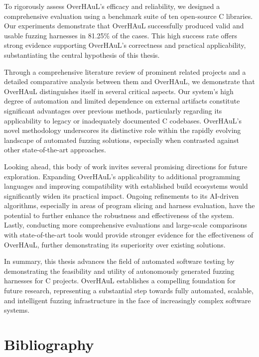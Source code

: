 \documentclass[
  a4paper,
]{scrreprt}
\theoremstyle{definition}
\theoremstyle{remark}
\begin{document}
To rigorously assess OverHAuL's efficacy and reliability, we designed a
comprehensive evaluation using a benchmark suite of ten open-source C
libraries. Our experiments demonstrate that OverHAuL successfully
produced valid and usable fuzzing harnesses in 81.25\% of the cases.
This high success rate offers strong evidence supporting OverHAuL's
correctness and practical applicability, substantiating the central
hypothesis of this thesis.

Through a comprehensive literature review of prominent related projects
and a detailed comparative analysis between them and OverHAuL, we
demonstrate that OverHAuL distinguishes itself in several critical
aspects. Our system's high degree of automation and limited dependence
on external artifacts constitute significant advantages over previous
methods, particularly regarding its applicability to legacy or
inadequately documented C codebases. OverHAuL's novel methodology
underscores its distinctive role within the rapidly evolving landscape
of automated fuzzing solutions, especially when contrasted against other
state-of-the-art approaches.

Looking ahead, this body of work invites several promising directions
for future exploration. Expanding OverHAuL's applicability to additional
programming languages and improving compatibility with established build
ecosystems would significantly widen its practical impact. Ongoing
refinements to its AI-driven algorithms, especially in areas of program
slicing and harness evaluation, have the potential to further enhance
the robustness and effectiveness of the system. Lastly, conducting more
comprehensive evaluations and large-scale comparisons with
state-of-the-art tools would provide stronger evidence for the
effectiveness of OverHAuL, further demonstrating its superiority over
existing solutions.

In summary, this thesis advances the field of automated software testing
by demonstrating the feasibility and utility of autonomously generated
fuzzing harnesses for C projects. OverHAuL establishes a compelling
foundation for future research, representing a substantial step towards
fully automated, scalable, and intelligent fuzzing infrastructure in the
face of increasingly complex software systems.


\chapter*{Bibliography}\label{bibliography}
\end{document}
